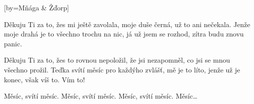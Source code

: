 [by={Mňága \& Žďorp}]

\beginverse*{}
\lrep{}       \rrep{}
\endverse{}

\beginverse{}
Děkuju Ti za to, žes mi ještě zavolala,  
moje duše černá, už to ani nečekala.  
Jenže moje drahá je to všechno trochu na nic,  
já už jsem se rozhod, zítra budu znovu panic.  
\endverse{}

\beginverse*{}
\lrep{}       \rrep{}
\endverse{}

\beginverse{}
\chordsoff{}
Děkuju Ti za to, žes to rovnou nepoložil,  
že jsi nezapomněl, co jsi se mnou všechno prožil.  
Teďka svítí měsíc pro každýho zvlášť, mě je to líto,  
jenže už je konec, 
však víš to. Vím to!
\chordson{}
\endverse{}

\beginchorus{}
Měsíc,  svítí měsíc.  
Měsíc,  svítí měsíc.  
Měsíc,  svítí měsíc.  
Měsíc\ldots{}
\endchorus{}

\endsong{}
